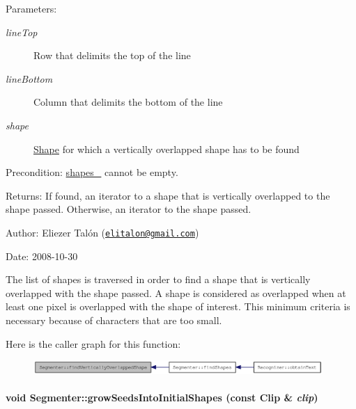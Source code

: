 \begin{Desc}
\item[Parameters:]
\begin{description}
\item[{\em lineTop}]Row that delimits the top of the line \item[{\em lineBottom}]Column that delimits the bottom of the line \item[{\em shape}]\hyperlink{class_shape}{Shape} for which a vertically overlapped shape has to be found\end{description}
\end{Desc}
\begin{Desc}
\item[Precondition:]\hyperlink{class_segmenter_41b94ede2829063e0937dc150756e77e}{shapes\_\-} cannot be empty.\end{Desc}
\begin{Desc}
\item[Returns:]If found, an iterator to a shape that is vertically overlapped to the shape passed. Otherwise, an iterator to the shape passed.\end{Desc}
\begin{Desc}
\item[Author:]Eliezer Talón (\href{mailto:elitalon@gmail.com}{\tt elitalon@gmail.com}) \end{Desc}
\begin{Desc}
\item[Date:]2008-10-30\end{Desc}
The list of shapes is traversed in order to find a shape that is vertically overlapped with the shape passed. A shape is considered as overlapped when at least one pixel is overlapped with the shape of interest. This minimum criteria is necessary because of characters that are too small. 

Here is the caller graph for this function:\nopagebreak
\begin{figure}[H]
\begin{center}
\leavevmode
\includegraphics[width=311pt]{class_segmenter_0961de0db6a0b1de51882024bfc830a1_icgraph}
\end{center}
\end{figure}
\hypertarget{class_segmenter_72c007e345fad7abbf6e9d4edb615a50}{
\paragraph[{growSeedsIntoInitialShapes}]{\setlength{\rightskip}{0pt plus 5cm}void Segmenter::growSeedsIntoInitialShapes (const {\bf Clip} \& {\em clip})}\hfill}
\label{class_segmenter_72c007e345fad7abbf6e9d4edb615a50}


